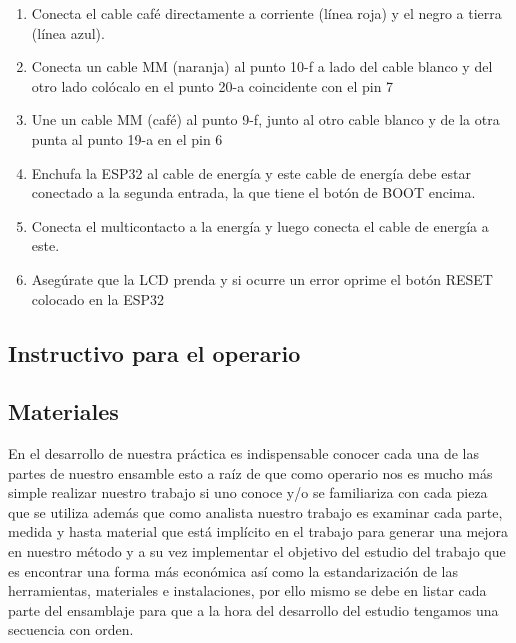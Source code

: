 \begin{enumerate}
        \item Conecta el cable café directamente a corriente (línea roja) y el negro a tierra (línea azul). 
    
        \item  Conecta un cable MM (naranja) al punto 10-f a lado del cable blanco y del otro lado colócalo en el punto 20-a coincidente con el pin 7
    
        \item Une un cable MM (café) al punto 9-f, junto al otro cable blanco y de la otra punta al punto 19-a en el pin 6 
    
        \item  Enchufa la ESP32 al cable de energía y este cable de energía debe estar conectado a la segunda entrada, la que tiene el botón de BOOT encima.
    
        \item Conecta el multicontacto a la energía y luego conecta el cable de energía a este.
    
    
        \item Asegúrate que la LCD prenda y si ocurre un error oprime el botón RESET colocado en la ESP32
    
    \end{enumerate}
    
    
    
    
    
    
    \subsection{Instructivo para el operario}
    
    \label{Figura:instructivo}
    
    
    
    
    
    
    \subsection{Materiales}
    
    En el desarrollo de nuestra práctica es indispensable conocer cada una de las partes de nuestro ensamble esto a raíz de que como operario nos es mucho más simple realizar nuestro trabajo si uno conoce y/o se familiariza con cada pieza que se utiliza además que como analista nuestro trabajo es examinar cada parte, medida y hasta material que está implícito en el trabajo para generar una mejora en nuestro método y a su vez implementar el objetivo del estudio del trabajo que es encontrar una forma más económica así como la estandarización de las herramientas, materiales e instalaciones, por ello mismo se debe en listar cada parte del ensamblaje para que a la hora del desarrollo del estudio tengamos una secuencia con orden.
    
